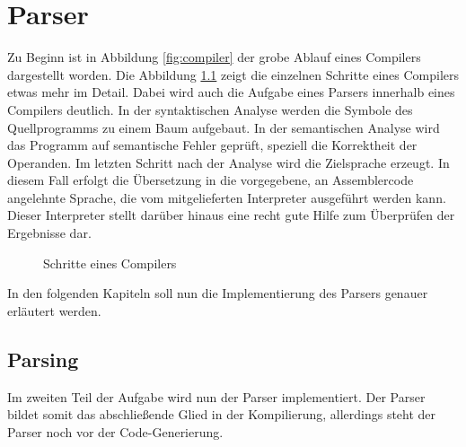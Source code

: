 \documentclass[a4paper,11pt]{report}
\begin{document}
\chapter{Parser}
Zu Beginn ist in Abbildung \ref{fig:compiler} der grobe Ablauf eines Compilers dargestellt worden.
Die Abbildung \ref{fig:compiler_big} zeigt die einzelnen Schritte eines Compilers etwas mehr im Detail.
Dabei wird auch die Aufgabe eines Parsers innerhalb eines Compilers deutlich.
In der syntaktischen Analyse werden die Symbole des Quellprogramms zu einem Baum aufgebaut.
In der semantischen Analyse wird das Programm auf semantische Fehler geprüft, speziell die Korrektheit der Operanden.
Im letzten Schritt nach der Analyse wird die Zielsprache erzeugt.
In diesem Fall erfolgt die Übersetzung in die vorgegebene, an Assemblercode angelehnte Sprache, die vom mitgelieferten Interpreter ausgeführt werden kann.
Dieser Interpreter stellt darüber hinaus eine recht gute Hilfe zum Überprüfen der Ergebnisse dar.

\begin{figure}
\centering
{}
\caption{Schritte eines Compilers}
\label{fig:compiler_big}
\end{figure}

In den folgenden Kapiteln soll nun die Implementierung des Parsers genauer erläutert werden.

\section{Parsing}
Im zweiten Teil der Aufgabe wird nun der Parser implementiert.
Der Parser bildet somit das abschließende Glied in der Kompilierung, allerdings steht der Parser noch vor der Code-Generierung.
\end{document}
